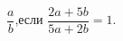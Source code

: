 \begin{ex}[type=calculate_expression]
	\begin{condition}
		\( \dfrac{a}{b} \),\quad если \( \dfrac{2a+5b}{5a+2b}=1 \).
	\end{condition}
\end{ex}